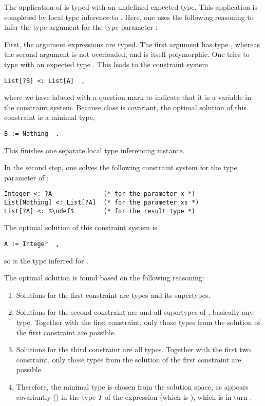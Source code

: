 The application of  is typed with an undefined expected type. This application is completed by local type inference to . Here, one uses the following reasoning to infer the type argument  for the type parameter :

First, the argument expressions are typed. The first argument  has type , whereas the second argument  is not overloaded, and is itself polymorphic. One tries to type  with an expected type . This leads to the constraint system
\begin{lstlisting}
List[?B] <: List[A]  ,
\end{lstlisting}
where we have labeled  with a question mark to indicate that it is a variable in the constraint system. Because class  is covariant, the optimal solution of this constraint is a minimal type, 
\begin{lstlisting}
B := Nothing  .
\end{lstlisting}

This finishes one separate local type inferencing instance. 

In the second step, one solves the following constraint system for the type parameter  of :
\begin{lstlisting}
Integer <: ?A              (* for the parameter x *)
List[Nothing] <: List[?A]  (* for the parameter xs *)
List[?A] <: $\udef$        (* for the result type *)
\end{lstlisting}

The optimal solution of this constraint system is 
\begin{lstlisting}
A := Integer  ,
\end{lstlisting}
so  is the type inferred for . 

The optimal solution is found based on the following reasoning: 
\begin{enumerate}
  \item Solutions for the first constraint are types  and its supertypes.
  \item Solutions for the second constraint are  and all supertypes of , basically any type. Together with the first constraint, only those types from the solution of the first constraint are possible. 
  \item Solutions for the third constraint are all types. Together with the first two constraint, only those types from the solution of the first constraint are possible. 
  \item Therefore, the minimal type is chosen from the solution space, as  appears covariantly () in the type $T$ of the expression (which is ), which is in turn . 
\end{enumerate}

